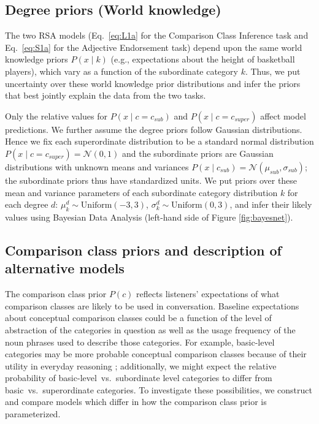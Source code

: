 \documentclass[doc]{apa6}
\begin{document}
\subsection{Degree priors (World knowledge)}

The two RSA models (Eq.~\ref{eq:L1a} for the Comparison Class Inference task and Eq.~\ref{eq:S1a} for the Adjective Endorsement task) depend upon the same world knowledge priors $P(x \mid k)$ (e.g., expectations about the height of basketball players), which vary as a function of the subordinate category $k$. 
Thus, we put uncertainty over these world knowledge prior distributions and infer the priors that best jointly explain the data from the two tasks. 

Only the relative values for \(P(x \mid c = c_{sub})\) and \(P(x \mid c = c_{super})\) affect model predictions. 
We further assume the degree priors follow Gaussian distributions.
Hence we fix each superordinate distribution to be a standard normal distribution \(P(x \mid c = c_{super}) = \mathcal{N}(0, 1)\) and the subordinate priors are Gaussian distributions with unknown means and variances \(P(x \mid c_{sub}) = \mathcal{N}(\mu_{sub}, \sigma_{sub})\); the subordinate priors thus have standardized units.
We put priors over these mean and variance parameters of each subordinate category distribution $k$ for each degree $d$: $\mu^d_k \sim \text{Uniform}(-3, 3)$, $\sigma^d_k \sim \text{Uniform}(0, 3)$, and infer their likely values using Bayesian Data Analysis (left-hand side of Figure \ref{fig:bayesnet}). 

\subsection{Comparison class priors and description of alternative models}

The comparison class prior $P(c)$ reflects listeners' expectations of what comparison classes are likely to be used in conversation. 
Baseline expectations about conceptual comparison classes could be a function of the level of abstraction of the categories in question as well as the usage frequency of the noun phrases used to describe those categories. 
For example, basic-level categories may be more probable conceptual comparison classes because of their utility in everyday reasoning \cite{rosch1975family}; additionally, we might expect the relative probability of basic-level~vs.~subordinate level categories to differ from basic~vs.~superordinate categories.
To investigate these possibilities, we construct and compare models which differ in how the comparison class prior is parameterized.
\end{document}
